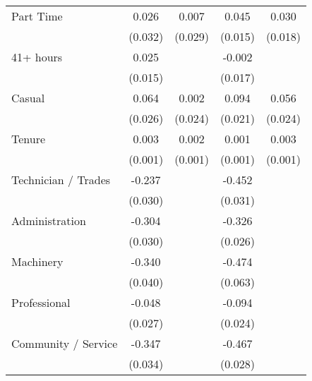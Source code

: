 {\begin{tabular}{l*{4}{c}}
Part Time           &       0.026         &       0.007         &       0.045\sym{***}&       0.030\sym{*}  \\
                    &     (0.032)         &     (0.029)         &     (0.015)         &     (0.018)         \\
41+ hours           &       0.025         &                     &      -0.002         &                     \\
                    &     (0.015)         &                     &     (0.017)         &                     \\
Casual              &       0.064\sym{**} &       0.002         &       0.094\sym{***}&       0.056\sym{**} \\
                    &     (0.026)         &     (0.024)         &     (0.021)         &     (0.024)         \\
Tenure              &       0.003\sym{**} &       0.002\sym{**} &       0.001         &       0.003\sym{***}\\
                    &     (0.001)         &     (0.001)         &     (0.001)         &     (0.001)         \\
Technician / Trades &      -0.237\sym{***}&                     &      -0.452\sym{***}&                     \\
                    &     (0.030)         &                     &     (0.031)         &                     \\
Administration      &      -0.304\sym{***}&                     &      -0.326\sym{***}&                     \\
                    &     (0.030)         &                     &     (0.026)         &                     \\
Machinery           &      -0.340\sym{***}&                     &      -0.474\sym{***}&                     \\
                    &     (0.040)         &                     &     (0.063)         &                     \\
Professional        &      -0.048\sym{*}  &                     &      -0.094\sym{***}&                     \\
                    &     (0.027)         &                     &     (0.024)         &                     \\
Community / Service &      -0.347\sym{***}&                     &      -0.467\sym{***}&                     \\
                    &     (0.034)         &                     &     (0.028)         &                     \\

\end{tabular}}
